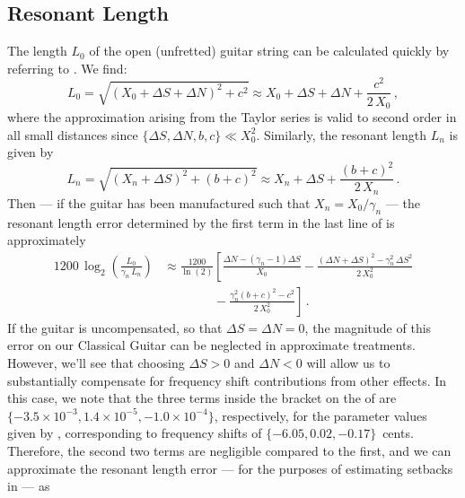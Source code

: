  \subsection{Resonant Length}
The length $L_0$ of the open (unfretted) guitar string can be calculated quickly by referring to . We find:
 \begin{equation}  \label{eqn:l_0_def}
L_0 = \sqrt{\left(X_0 + \Delta S + \Delta N\right)^2 + c^2} \approx X_0 + \Delta S + \Delta N + \frac{c^2}{2\, X_0}\, ,
 \end{equation}
where the approximation arising from the Taylor series is valid to second order in all small distances since $\{\Delta S, \Delta N, b, c\} \ll X_0^2$. Similarly, the resonant length $L_n$ is given by
 \begin{equation}  \label{eqn:l_n_def}
L_n = \sqrt{\left(X_n + \Delta S\right)^2 + (b + c)^2} \approx X_n + \Delta S + \frac{(b + c)^2}{2\, X_n}\, .
 \end{equation}
Then --- if the guitar has been manufactured such that $X_n = X_0 / \gamma_n$ --- the resonant length error determined by the first term in the last line of  is approximately
\begin{equation} \label{eqn:rle_taylor}
  \begin{split}
    1200\, \log_2 \left( \frac{L_0}{\gamma_n\, L_n} \right) &\approx \frac{1200}{\ln(2)} \left[ \frac{\Delta N - \left(\gamma_n - 1\right) \Delta S}{X_0} - \frac{(\Delta N + \Delta S)^2 - \gamma_n^2\, \Delta S^2}{2\, X_0^2}\right. \\ &\qquad\qquad - \left. \frac{\gamma_n^2 (b + c)^2 - c^2}{2\, X_0^2}\right]\, .
  \end{split}
\end{equation}
If the guitar is uncompensated, so that $\Delta S = \Delta N = 0$, the magnitude of this error on our Classical Guitar can be neglected in approximate treatments. However, we'll see that choosing $\Delta S > 0$ and $\Delta N < 0$ will allow us to substantially compensate for frequency shift contributions from other effects. In this case, we note that the three terms inside the bracket on the \rhs of  are $\{-3.5 \times 10^{-3}, 1.4 \times 10^{-5}, -1.0 \times 10^{-4}\}$, respectively, for the parameter values given by , corresponding to frequency shifts of $\{-6.05, 0.02, -0.17\}$~cents. Therefore, the second two terms are negligible compared to the first, and we can approximate the resonant length error --- for the purposes of estimating setbacks in  --- as
